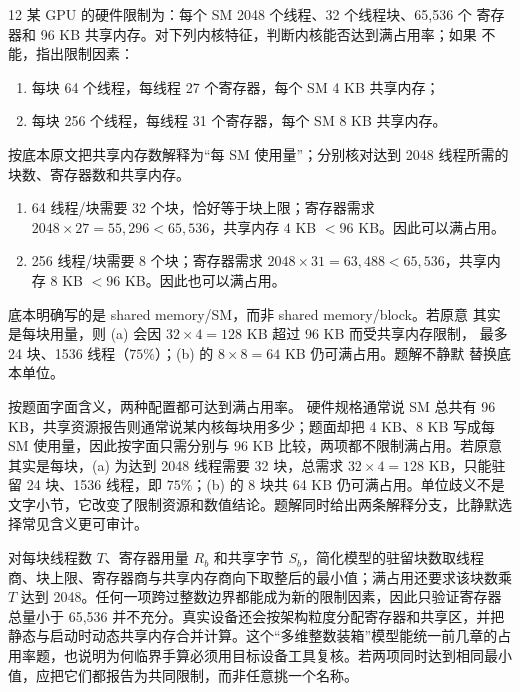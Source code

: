 \begin{solutionexercise}{12}
\problemheading 某 GPU 的硬件限制为：每个 SM 2048 个线程、32 个线程块、65,536 个
寄存器和 96 KB 共享内存。对下列内核特征，判断内核能否达到满占用率；如果
不能，指出限制因素：
\begin{enumerate}[label=\alph*.,leftmargin=2.2em]
  \item 每块 64 个线程，每线程 27 个寄存器，每个 SM 4 KB 共享内存；
  \item 每块 256 个线程，每线程 31 个寄存器，每个 SM 8 KB 共享内存。
\end{enumerate}

\approachheading 按底本原文把共享内存数解释为“每 SM 使用量”；分别核对达到 2048
线程所需的块数、寄存器数和共享内存。

\answerheading
\begin{enumerate}[label=\alph*.,leftmargin=2.2em]
\item 64 线程/块需要 32 个块，恰好等于块上限；寄存器需求
$2048\times27=55{,}296<65{,}536$，共享内存 $4$ KB $<96$ KB。因此可以满占用。
\item 256 线程/块需要 8 个块；寄存器需求
$2048\times31=63{,}488<65{,}536$，共享内存 $8$ KB $<96$ KB。因此也可以满占用。
\end{enumerate}

\editorialnote 底本明确写的是 shared memory/SM，而非 shared memory/block。若原意
其实是每块用量，则 (a) 会因 $32\times4=128$ KB 超过 96 KB 而受共享内存限制，
最多 24 块、1536 线程（$75\%$）；(b) 的 $8\times8=64$ KB 仍可满占用。题解不静默
替换底本单位。

\conclusionheading 按题面字面含义，两种配置都可达到满占用率。
\discussionheading
{}
硬件规格通常说 SM 总共有 96 KB，共享资源报告则通常说某内核每块用多少；题面却把 4 KB、8 KB 写成每 SM 使用量，因此按字面只需分别与 96 KB 比较，两项都不限制满占用。若原意其实是每块，(a) 为达到 2048 线程需要 32 块，总需求 $32\times4=128$ KB，只能驻留 24 块、1536 线程，即 $75\%$；(b) 的 8 块共 64 KB 仍可满占用。单位歧义不是文字小节，它改变了限制资源和数值结论。题解同时给出两条解释分支，比静默选择常见含义更可审计。

对每块线程数 $T$、寄存器用量 $R_b$ 和共享字节 $S_b$，简化模型的驻留块数取线程商、块上限、寄存器商与共享内存商向下取整后的最小值；满占用还要求该块数乘 $T$ 达到 2048。任何一项跨过整数边界都能成为新的限制因素，因此只验证寄存器总量小于 65,536 并不充分。真实设备还会按架构粒度分配寄存器和共享区，并把静态与启动时动态共享内存合并计算。这个“多维整数装箱”模型能统一前几章的占用率题，也说明为何临界手算必须用目标设备工具复核。若两项同时达到相同最小值，应把它们都报告为共同限制，而非任意挑一个名称。


\end{solutionexercise}
